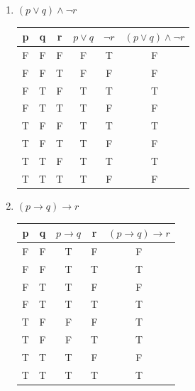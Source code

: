 \documentclass[fleqn, 12pt]{article}
\theoremstyle{definition}
\begin{document}
\begin{enumerate}
\item $(p \lor q) \land \neg r$
\begin{table}[htp]
  \begin{center}
    \begin{tabular}{|c|c|c|c|c|c|} 
\hline
      p & q  &  r & $p \lor q$ & $\neg r$ & $(p \lor q) \land \neg r$\\
      \hline
	F & F & F & F & T & F\\
\hline
	F & F & T & F & F & F\\
\hline
	F & T & F  & T & T & T\\
\hline
 	F & T & T  & T & F & F\\
\hline
	T & F & F & T & T & T\\
\hline
	T & F & T & T & F & F\\
\hline
	T & T & F  & T & T & T\\
\hline
 	T & T & T  & T & F & F\\
\hline
    \end{tabular}
  \end{center}
\end{table}
\newpage
\item $(p \to q) \to r$
\begin{table}[htp]
  \begin{center}
    \begin{tabular}{|c|c|c|c|c|} 
\hline
      p & q  & $p \to q$  & r & $(p \to q) \to r$\\
      \hline
	F & F & T & F & F\\
\hline
	F & F & T & T & T\\
\hline
	F & T & T  & F & F\\
\hline
 	F & T & T  & T & T\\
\hline
	T & F & F & F & T\\
\hline
	T & F & F & T & T\\
\hline
	T & T & T  & F & F\\
\hline
 	T & T & T  & T & T\\
\hline
    \end{tabular}
  \end{center}
\end{table}


\end{enumerate}
\end{document}
